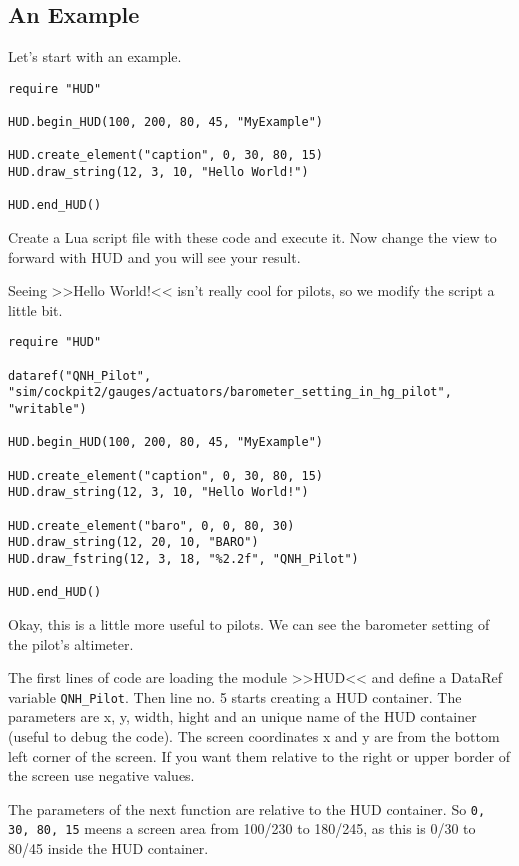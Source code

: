 \documentclass[11pt,parskip=half,a4paper]{scrartcl}
\begin{document}
\subsection{An Example}

Let's start with an example.

\begin{lstlisting}[firstnumber=1]
require "HUD"

HUD.begin_HUD(100, 200, 80, 45, "MyExample")

HUD.create_element("caption", 0, 30, 80, 15)
HUD.draw_string(12, 3, 10, "Hello World!")

HUD.end_HUD()
\end{lstlisting}

Create a Lua script file with these code and execute it. Now change the view to forward with HUD and you will see your result.

Seeing >>Hello World!<< isn't really cool for pilots, so we modify the script a little bit.

\begin{lstlisting}[firstnumber=1]
require "HUD"

dataref("QNH_Pilot", "sim/cockpit2/gauges/actuators/barometer_setting_in_hg_pilot", "writable")

HUD.begin_HUD(100, 200, 80, 45, "MyExample")

HUD.create_element("caption", 0, 30, 80, 15)
HUD.draw_string(12, 3, 10, "Hello World!")

HUD.create_element("baro", 0, 0, 80, 30)
HUD.draw_string(12, 20, 10, "BARO")
HUD.draw_fstring(12, 3, 18, "%2.2f", "QNH_Pilot")

HUD.end_HUD()
\end{lstlisting}

Okay, this is a little more useful to pilots. We can see the barometer setting of the pilot's altimeter.

The first lines of code are loading the module >>HUD<< and define a DataRef variable \verb|QNH_Pilot|. Then line no. 5 starts creating a HUD container. The parameters are x, y, width, hight and an unique name of the HUD container (useful to debug the code). The screen coordinates x and y are from the bottom left corner of the screen. If you want them relative to the right or upper border of the screen use negative values.

The parameters of the next function are relative to the HUD container. So \verb|0, 30, 80, 15| meens a screen area from 100/230 to 180/245, as this is 0/30 to 80/45 inside the HUD container.
\end{document}
